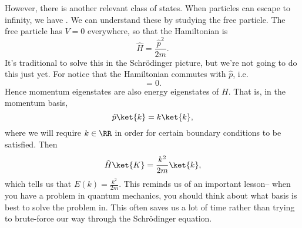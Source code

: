 However, there is another relevant class of states. When particles can escape to infinity, we have . We can understand these by studying the free particle. The free particle has $V=0$ everywhere, so that the Hamiltonian is
\begin{equation}
    \hat H = \frac{\hat p^2}{2m}.
\end{equation}
It's traditional to solve this in the Schr\"odinger picture, but we're not going to do this just yet. For notice that the Hamiltonian commutes with $\hat p$, i.e.
\begin{equation}
    [\hat H ,\hat p]=0.
\end{equation}
Hence momentum eigenstates are also energy eigenstates of $H$. That is, in the momentum basis,
\begin{equation}
    \hat p \ket{k} = k\ket{k},
\end{equation}
where we will require $k\in \RR$ in order for certain boundary conditions to be satisfied. Then
\begin{equation}
    \hat H \ket{K} =\frac{k^2}{2m} \ket{k},
\end{equation}
which tells us that $E(k) =\frac{k^2}{2m}$. This reminds us of an important lesson-- when you have a problem in quantum mechanics, you should think about what basis is best to solve the problem in. This often saves us a lot of time rather than trying to brute-force our way through the Schr\"odinger equation.

